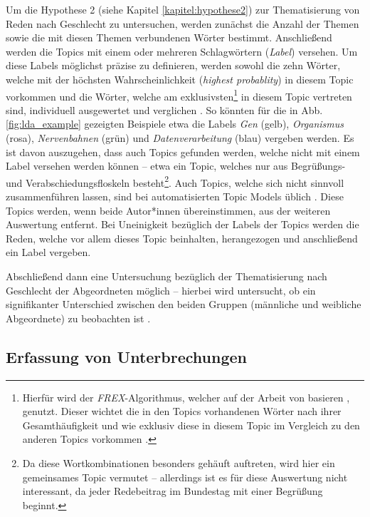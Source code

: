 \documentclass[12pt, 
    twoside=false, 
    bibliography=totoc, 
    numbers=endperiod, 
    headings=normal, 
    toc=chapterentrydotfill
    ]{scrbook}
\begin{document}
Um die Hypothese 2 (siehe Kapitel \ref{kapitel:hypothese2}) zur Thematisierung von Reden nach Geschlecht zu untersuchen, werden zunächst die Anzahl der Themen sowie die mit diesen Themen verbundenen Wörter bestimmt. Anschließend werden die Topics mit einem oder mehreren Schlagwörtern (\emph{Label}) versehen. Um diese Labels möglichst präzise zu definieren, werden sowohl die zehn Wörter, welche mit der höchsten Wahrscheinlichkeit (\emph{highest probablity}) in diesem Topic vorkommen und die Wörter, welche am exklusivsten\footnote{Hierfür wird der \emph{FREX}-Algorithmus, welcher auf der Arbeit von \textcite{airoldi_2016} basieren \parencite[12]{roberts_2018}, genutzt. Dieser wichtet die in den Topics vorhandenen Wörter nach ihrer Gesamthäufigkeit und wie exklusiv diese in diesem Topic im Vergleich zu den anderen Topics vorkommen \parencite[13f.]{roberts_2018}.} in diesem Topic vertreten sind, individuell ausgewertet und verglichen \parencite[13f.]{roberts_2018}. So könnten für die in Abb. \ref{fig:lda_example} gezeigten Beispiele etwa die Labels \emph{Gen} (gelb), \emph{Organismus} (rosa), \emph{Nervenbahnen} (grün) und \emph{Datenverarbeitung} (blau) vergeben werden.
Es ist davon auszugehen, dass auch Topics gefunden werden, welche nicht mit einem Label versehen werden können – etwa ein Topic, welches nur aus Begrüßungs- und Verabschiedungsfloskeln besteht\footnote{Da diese Wortkombinationen besonders gehäuft auftreten, wird hier ein gemeinsames Topic vermutet – allerdings ist es für diese Auswertung nicht interessant, da jeder Redebeitrag im Bundestag mit einer Begrüßung beginnt.}. Auch Topics, welche sich nicht sinnvoll zusammenführen lassen, sind bei automatisierten Topic Models üblich \parencites[262]{mimno_2011}[11]{grajzl_2018}. Diese Topics werden, wenn beide Autor*innen übereinstimmen, aus der weiteren Auswertung entfernt. Bei Uneinigkeit bezüglich der Labels der Topics werden die Reden, welche vor allem dieses Topic beinhalten, herangezogen und anschließend ein Label vergeben.

Abschließend dann eine Untersuchung bezüglich der Thematisierung nach Geschlecht der Abgeordneten möglich – hierbei wird untersucht, ob ein signifikanter Unterschied zwischen den beiden Gruppen (männliche und weibliche Abgeordnete) zu beobachten ist \parencite[vgl.][3]{roberts_2013}. 


\subsection{Erfassung von Unterbrechungen}
\end{document}
